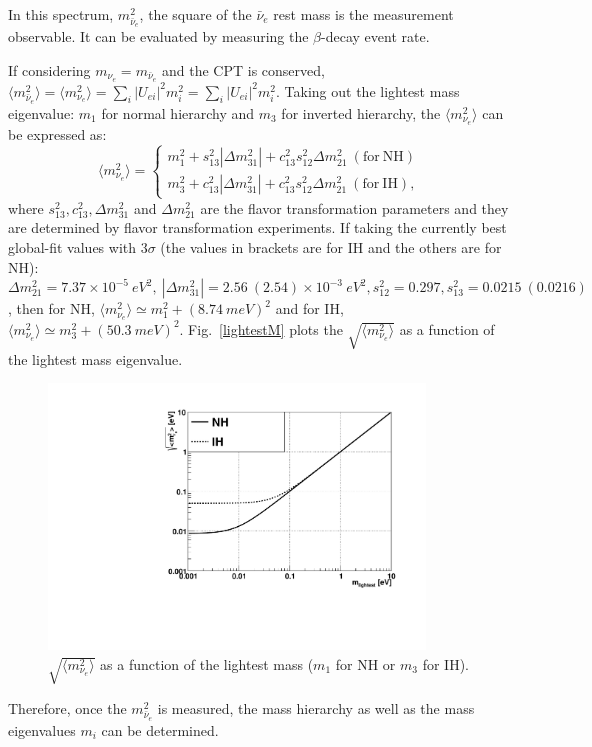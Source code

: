 In this spectrum, $m^2_{\bar{\nu}_e}$, the square of the $\bar{\nu}_e$ rest mass is the measurement observable. It can be evaluated by measuring the $\beta$-decay event rate\cite{rottele2019tritium}.

If considering $m_{\nu_e}=m_{\bar{\nu}_e}$ and the CPT is conserved, $\langle m^2_{\bar{\nu}_e}\rangle=\langle m^2_{{\nu}_e}\rangle=\sum_i |U_{ei}|^2 m_i^2=\sum_i |U_{ei}|^2 m_i^2$. Taking out the lightest mass eigenvalue: $m_1$ for normal hierarchy and $m_3$ for inverted hierarchy, the $\langle m^2_{\nu_e}\rangle$ can be expressed as\cite{suekane2015neutrino}:
\begin{equation}\label{nuMassSquare}
\langle m^2_{\nu_e}\rangle = 
\begin{cases}
m_1^2+s^2_{13}|\Delta m^2_{31}|+c^2_{13}s^2_{12}\Delta m^2_{21}~(\mathrm{for~NH})\\
m_3^2+c^2_{13}|\Delta m^2_{31}|+c^2_{13}s^2_{12}\Delta m^2_{21}~(\mathrm{for~IH}),
\end{cases}
\end{equation}
where $s^2_{13}, c^2_{13}, \Delta m^2_{31}$ and $\Delta m^2_{21}$ are the flavor transformation parameters and they are determined by flavor transformation experiments. If taking the currently best global-fit values with $3\sigma$ (the values in brackets are for IH and the others are for NH): $\Delta m^2_{21}= 7.37 \times 10^{-5}~eV^2,~|\Delta m^2_{31}|= 2.56~(2.54)\times 10^{-3}~eV^2 ,s^2_{12}= 0.297, s^2_{13}= 0.0215~(0.0216)$\cite{pdg2018}, then  for NH, $\langle m^2_{\nu_e}\rangle \simeq m_1^2+(8.74~meV)^2$ and for IH, $\langle m^2_{\nu_e}\rangle \simeq m_3^2+(50.3~meV)^2$.
Fig.~\ref{lightestM} plots the $\sqrt{\langle m^2_{\nu_e}\rangle}$ as a function of the lightest mass eigenvalue.
\begin{figure}[htbp]\label{lightestM}
	\centering	
	\includegraphics[width=10cm]{nu_massHierarchy.pdf}
	\caption{$\sqrt{\langle m^2_{\nu_e}\rangle}$ as a function of the lightest mass ($m_1$ for NH or $m_3$ for IH).}
	\label{nuMass}
\end{figure}
Therefore, once the $m^2_{\bar{\nu}_e}$ is measured, the mass hierarchy as well as the mass eigenvalues $m_i$ can be determined.

